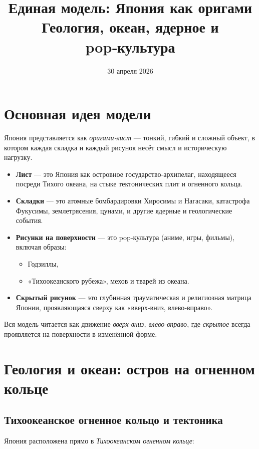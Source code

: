 \documentclass[12pt]{article}
\title{Единая модель: Япония как оригами \\ Геология, океан, ядерное и pop‑культура}
\author{}
\date{30 апреля 2026}
\begin{document}
\maketitle

\tableofcontents
\newpage

\section{Основная идея модели}

Япония представляется как \emph{оригами‑лист} — тонкий, гибкий и сложный объект, в котором каждая складка и каждый рисунок несёт смысл и историческую нагрузку.

\begin{itemize}
  \item \textbf{Лист} — это Япония как островное государство‑архипелаг, находящееся посреди Тихого океана, на стыке тектонических плит и огненного кольца.
  \item \textbf{Складки} — это атомные бомбардировки Хиросимы и Нагасаки, катастрофа Фукусимы, землетрясения, цунами, и другие ядерные и геологические события.
  \item \textbf{Рисунки на поверхности} — это pop‑культура (аниме, игры, фильмы), включая образы:
    \begin{itemize}
      \item Годзиллы,
      \item «Тихоокеанского рубежа», мехов и тварей из океана.
    \end{itemize}
  \item \textbf{Скрытый рисунок} — это глубинная трауматическая и религиозная матрица Японии, проявляющаяся сверху как «вверх‑вниз, влево‑вправо».
\end{itemize}

Вся модель читается как движение \emph{вверх‑вниз, влево‑вправо}, где \emph{скрытое} всегда проявляется на поверхности в изменённой форме.

\section{Геология и океан: остров на огненном кольце}

\subsection{Тихоокеанское огненное кольцо и тектоника}

Япония расположена прямо в \emph{Тихоокеанском огненном кольце}:
\end{document}
